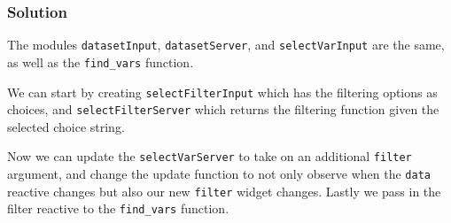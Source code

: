 \documentclass[]{book}
\newenvironment{Shaded}{\begin{snugshade}}{\end{snugshade}}
\newcommand{\CommentTok}[1]{\textcolor[rgb]{0.56,0.35,0.01}{\textit{#1}}}
\newcommand{\ControlFlowTok}[1]{\textcolor[rgb]{0.13,0.29,0.53}{\textbf{#1}}}
\newcommand{\DataTypeTok}[1]{\textcolor[rgb]{0.13,0.29,0.53}{#1}}
\newcommand{\KeywordTok}[1]{\textcolor[rgb]{0.13,0.29,0.53}{\textbf{#1}}}
\newcommand{\NormalTok}[1]{#1}
\newcommand{\OperatorTok}[1]{\textcolor[rgb]{0.81,0.36,0.00}{\textbf{#1}}}
\newcommand{\StringTok}[1]{\textcolor[rgb]{0.31,0.60,0.02}{#1}}
\begin{document}
\begin{solution}

\hypertarget{solution-1}{%
\subsubsection*{Solution}\label{solution-1}}

The modules \texttt{datasetInput}, \texttt{datasetServer}, and \texttt{selectVarInput} are the same, as well as the \texttt{find\_vars} function.

We can start by creating \texttt{selectFilterInput} which has the filtering options as choices, and \texttt{selectFilterServer} which returns the filtering function given the selected choice string.

\begin{Shaded}
\end{Shaded}

Now we can update the \texttt{selectVarServer} to take on an additional \texttt{filter} argument, and change the update function to not only observe when the \texttt{data} reactive changes but also our new \texttt{filter} widget changes. Lastly we pass in the filter reactive to the \texttt{find\_vars} function.


\end{solution}
\end{document}
